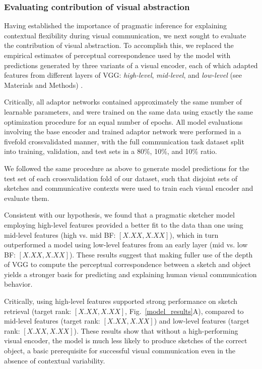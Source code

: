 \documentclass[9pt,twocolumn,twoside]{pnas-new}
\begin{document}
\subsubsection*{Evaluating contribution of visual abstraction}

Having established the importance of pragmatic inference for explaining contextual flexibility during visual communication, we next sought to evaluate the contribution of visual abstraction.
To accomplish this, we replaced the empirical estimates of perceptual correspondence used by the model with predictions generated by three variants of a visual encoder, each of which adapted features from different layers of VGG: \textit{high-level}, \textit{mid-level}, and \textit{low-level} (see Materials and Methods) .

Critically, all adaptor networks contained approximately the same number of learnable parameters, and were trained on the same data using exactly the same optimization procedure for an equal number of epochs. 
All model evaluations involving the base encoder and trained adaptor network were performed in a fivefold crossvalidated manner, with the full communication task dataset split into training, validation, and test sets in a 80\%, 10\%, and 10\% ratio. 

We followed the same procedure as above to generate model predictions for the test set of each crossvalidation fold of our dataset, such that disjoint sets of sketches and communicative contexts were used to train each visual encoder and evaluate them.
 

Consistent with our hypothesis, we found that a pragmatic sketcher model employing high-level features provided a better fit to the data than one using mid-level features (high vs. mid BF: $[X.XX, X.XX]$), which in turn outperformed a model using low-level features from an early layer (mid vs. low BF: $[X.XX, X.XX]$). 
These results suggest that making fuller use of the depth of VGG to compute the perceptual correspondence between a sketch and object yields a stronger basis for predicting and explaining human visual communication behavior.

Critically, using high-level features supported strong performance on sketch retrieval (target rank: $[X.XX, X.XX]$, Fig.~\ref{model_results}A), compared to mid-level features (target rank: $[X.XX, X.XX]$) and low-level features (target rank: $[X.XX, X.XX]$). 
These results show that without a high-performing visual encoder, the model is much less likely to produce sketches of the correct object, a basic prerequisite for successful visual communication even in the absence of contextual variability. 
\end{document}
